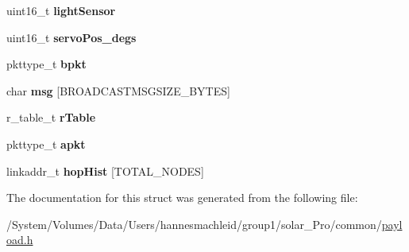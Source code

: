 \begin{DoxyCompactItemize}
\mbox{\label{struct____attribute_____acc772cd63b58f719309c8993582b2278}} 
uint16\+\_\+t {\bfseries light\+Sensor}
\item 
\mbox{\label{struct____attribute_____a8f113b0c596cda2d171aeec5506282f0}} 
uint16\+\_\+t {\bfseries servo\+Pos\+\_\+degs}
\item 
\mbox{\label{struct____attribute_____a0a245203db0f09476665278d3674b821}} 
pkttype\+\_\+t {\bfseries bpkt}
\item 
\mbox{\label{struct____attribute_____ab27e942ea36dc445c1186d67b113c147}} 
char {\bfseries msg} \mbox{[}B\+R\+O\+A\+D\+C\+A\+S\+T\+M\+S\+G\+S\+I\+Z\+E\+\_\+\+B\+Y\+T\+ES\mbox{]}
\item 
\mbox{\label{struct____attribute_____afba0b668396525eaf95b908607955a8e}} 
r\+\_\+table\+\_\+t {\bfseries r\+Table}
\item 
\mbox{\label{struct____attribute_____aff8387d67f46faab7aef0689fe49cc8e}} 
pkttype\+\_\+t {\bfseries apkt}
\item 
\mbox{\label{struct____attribute_____a3810b5cc5c836d971aaef3a03f9894a1}} 
linkaddr\+\_\+t {\bfseries hop\+Hist} \mbox{[}T\+O\+T\+A\+L\+\_\+\+N\+O\+D\+ES\mbox{]}
\end{DoxyCompactItemize}


The documentation for this struct was generated from the following file\+:\begin{DoxyCompactItemize}
\item 
/\+System/\+Volumes/\+Data/\+Users/hannesmachleid/group1/solar\+\_\+\+Pro/common/\mbox{\hyperlink{payload_8h}{payload.\+h}}\end{DoxyCompactItemize}
